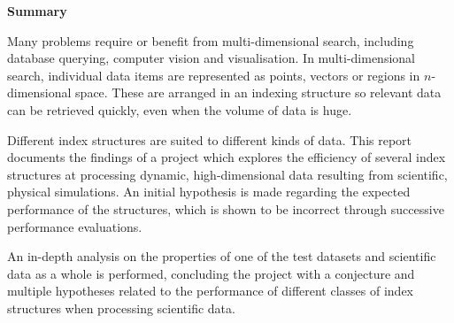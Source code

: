 \begin{center}
    {\LARGE\bf Summary}
\end{center}

Many problems require or benefit from multi-dimensional search, including database querying, computer vision and visualisation. In multi-dimensional search, individual data items are represented as points, vectors or regions in $n$-dimensional space. These are arranged in an indexing structure so relevant data can be retrieved quickly, even when the volume of data is huge.

Different index structures are suited to different kinds of data. This report documents the findings of a project which explores the efficiency of several index structures at processing dynamic, high-dimensional data resulting from scientific, physical simulations. An initial hypothesis is made regarding the expected performance of the structures, which is shown to be incorrect through successive performance evaluations.

An in-depth analysis on the properties of one of the test datasets and scientific data as a whole is performed, concluding the project with a conjecture and multiple hypotheses related to the performance of different classes of index structures when processing scientific data.

